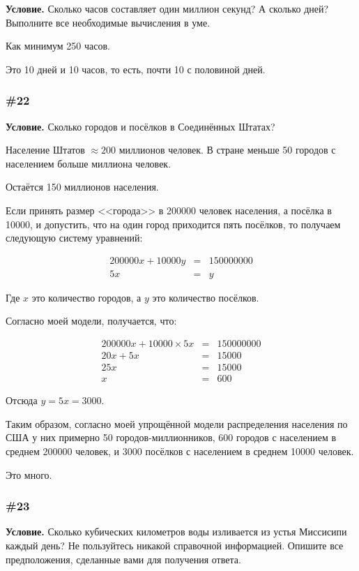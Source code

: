 \documentclass{article}
\begin{document}
\textbf{Условие.}
Сколько часов составляет один миллион секунд?
А сколько дней?
Выполните все необходимые вычисления в уме.

Как минимум 250 часов.

Это 10 дней и 10 часов, то есть, почти 10 с половиной дней.

\subsubsection{\#22}

\textbf{Условие.}
Сколько городов и посёлков в Соединённых Штатах?

Население Штатов $\approx 200$ миллионов человек.
В стране меньше 50 городов с населением больше миллиона человек.

Остаётся 150 миллионов населения.

Если принять размер <<города>> в 200000 человек населения, а посёлка в 10000,
и допустить, что на один город приходится пять посёлков, то получаем следующую систему уравнений:

\begin{eqnarray}
    200000x + 10000y &=& 150000000\\
    5x &=& y
\end{eqnarray}

Где $x$ это количество городов, а $y$ это количество посёлков.

Согласно моей модели, получается, что:

\begin{eqnarray}
    200000x + 10000 \times 5x &=& 150000000\\
    20x + 5x &=& 15000\\
    25x &=& 15000\\
    x &=& 600
\end{eqnarray}

Отсюда $y = 5x = 3000$.

Таким образом, согласно моей упрощённой модели распределения населения по США
у них примерно 50 городов-миллионников, 600 городов с населением в среднем 200000 человек,
и 3000 посёлков с населением в среднем 10000 человек.

Это много.

\subsubsection{\#23}

\textbf{Условие.}
Сколько кубических километров воды изливается из устья Миссисипи каждый день?
Не пользуйтесь никакой справочной информацией.
Опишите все предположения, сделанные вами для получения ответа.
\end{document}
